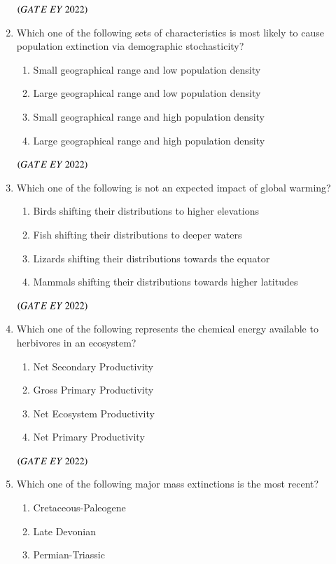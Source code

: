 \documentclass[journal]{IEEEtran}
\numberwithin{equation}{enumi}
\numberwithin{figure}{enumi}
\begin{document}
\begin{enumerate}
\begin{enumerate}
    \end{enumerate}
    \hfill{$\brak{ GATE\ EY\ 2022}$}
    \bigskip
 \item Which one of the following sets of characteristics is most likely to cause
population extinction via demographic stochasticity?
    \begin{enumerate}
        \item  Small geographical range and low population density
        \item  Large geographical range and low population density
        \item  Small geographical range and high population density
        \item  Large geographical range and high population density
    \end{enumerate}
    \hfill{$\brak{ GATE\ EY\ 2022}$}
    \bigskip
 \item Which one of the following is not an expected impact of global warming?
    \begin{enumerate}
        \item  Birds shifting their distributions to higher elevations
        \item  Fish shifting their distributions to deeper waters
        \item  Lizards shifting their distributions towards the equator
        \item  Mammals shifting their distributions towards higher latitudes
    \end{enumerate}
    \hfill{$\brak{ GATE\ EY\ 2022}$}
    \bigskip
 \item Which one of the following represents the chemical energy available to herbivores
in an ecosystem?
    \begin{enumerate}
        \item  Net Secondary Productivity
        \item  Gross Primary Productivity
        \item  Net Ecosystem Productivity
        \item  Net Primary Productivity
    \end{enumerate}
    \hfill{$\brak{ GATE\ EY\ 2022}$}
    \bigskip
 \item Which one of the following major mass extinctions is the most recent?
    \begin{enumerate}
        \item  Cretaceous-Paleogene
        \item  Late Devonian
        \item  Permian-Triassic

\end{enumerate}
\end{enumerate}
\end{document}
